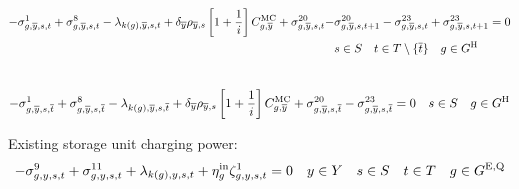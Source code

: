\documentclass{article}
\begin{document}
\begin{align}
-\dMinPowerOutput[\iGenerator,\iYearTerminal,\iScenario,\iInterval] + \dMaxPowerOutputHydro[\iGenerator,\iYearTerminal,\iScenario,\iInterval] - \dPowerBalance[k(\iGenerator),\iYearTerminal,\iScenario,\iInterval] + \cDiscountRate[\iYearTerminal] \cScenarioDuration[\iYearTerminal,\iScenario] \left[1 + \frac{1}{\cInterestRate}\right] \cMarginalCost[\iGenerator,\iYearTerminal] + \dRampRateUp[\iGenerator,\iYearTerminal,\iScenario,\iInterval] - & \dRampRateUp[\iGenerator,\iYearTerminal,\iScenario,\iInterval + 1] - \dRampRateDown[\iGenerator,\iYearTerminal,\iScenario,\iInterval] + \dRampRateDown[\iGenerator,\iYearTerminal,\iScenario,\iInterval + 1] = 0 \nonumber \\
& \iScenario \in \sScenarios \quad \iInterval \in \sIntervals \setminus \{\iIntervalTerminal\} \quad \iGenerator \in \sGeneratorsHydro\\ \nonumber
\end{align}

\begin{equation}
-\dMinPowerOutput[\iGenerator,\iYearTerminal,\iScenario,\iIntervalTerminal] + \dMaxPowerOutputHydro[\iGenerator,\iYearTerminal,\iScenario,\iIntervalTerminal] - \dPowerBalance[k(\iGenerator),\iYearTerminal,\iScenario,\iIntervalTerminal] + \cDiscountRate[\iYearTerminal] \cScenarioDuration[\iYearTerminal,\iScenario] \left[1 + \frac{1}{\cInterestRate}\right] \cMarginalCost[\iGenerator,\iYearTerminal] + \dRampRateUp[\iGenerator,\iYearTerminal,\iScenario,\iIntervalTerminal] - \dRampRateDown[\iGenerator,\iYearTerminal,\iScenario,\iIntervalTerminal] = 0 \quad \iScenario \in \sScenarios \quad \iGenerator \in \sGeneratorsHydro
\end{equation}

Existing storage unit charging power:
\begin{equation}
- \dNonNegativeCharging + \dMaxChargingRateExisting + \dPowerBalance[k(\iGenerator),\iYear,\iScenario,\iInterval] + \cStorageUnitEfficiencyCharging\dStorageEnergyTransition = 0 \quad \iYear \in \sYears \quad \iScenario \in \sScenarios \quad \iInterval \in \sIntervals \quad \iGenerator \in \sStorageExisting
\end{equation}
\end{document}
